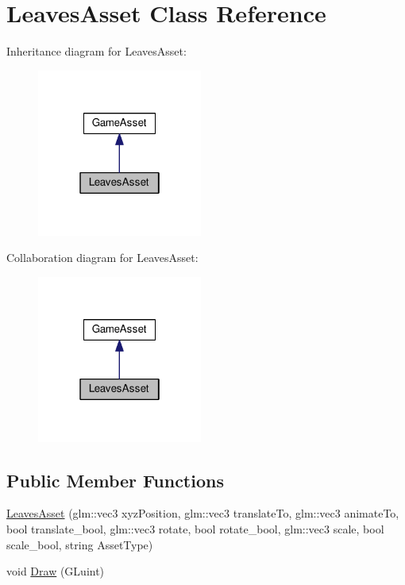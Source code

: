 \hypertarget{class_leaves_asset}{}\section{Leaves\+Asset Class Reference}
\label{class_leaves_asset}


Inheritance diagram for Leaves\+Asset\+:
\nopagebreak
\begin{figure}[H]
\begin{center}
\leavevmode
\includegraphics[width=154pt]{class_leaves_asset__inherit__graph}
\end{center}
\end{figure}


Collaboration diagram for Leaves\+Asset\+:
\nopagebreak
\begin{figure}[H]
\begin{center}
\leavevmode
\includegraphics[width=154pt]{class_leaves_asset__coll__graph}
\end{center}
\end{figure}
\subsection*{Public Member Functions}
\begin{DoxyCompactItemize}
\item 
\hyperlink{class_leaves_asset_aa14436bbd45d5cce3e87bb79c2490a53}{Leaves\+Asset} (glm\+::vec3 xyz\+Position, glm\+::vec3 translate\+To, glm\+::vec3 animate\+To, bool translate\+\_\+bool, glm\+::vec3 rotate, bool rotate\+\_\+bool, glm\+::vec3 scale, bool scale\+\_\+bool, string Asset\+Type)
\item 
void \hyperlink{class_leaves_asset_a807fd196b83e5adb131d489ef6645742}{Draw} (G\+Luint)
\end{DoxyCompactItemize}


